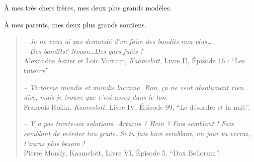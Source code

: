 
\begin{dedication}

    À mes très chers frères, mes deux plus grands modèles.

    À mes parents, mes deux plus grands soutiens.


    \hr{}

    \vfill{}


    \begin{small}
    \begin{quote}
        \emph{-- Je ne vous ai pas demandé d'en faire des \emph{bandits} non plus\dots}\\
        \emph{-- Des \emph{bandits}? Nooon\dots Des gars futés !}\\
        Alexandre Astier et Loïc Varraut,
        \emph{Kaamelott}, Livre II, Épisode 16 : ``Les tuteurs''.

    \vspace*{4pt}

        \emph{-- Victoriae mundis et mundis lacrima. Bon, ça ne veut absolument rien dire, mais je trouve que c’est assez dans le ton.}\\
        François Rollin, \emph{Kaamelott}, Livre IV, Épisode 99, ``Le désordre et la nuit''.

    \vspace*{4pt}

        \emph{
            -- Y a pas trente-six solutions.
            Arturus ? Hein ? Fais semblant !
            Fais semblant de mériter ton grade.
            Si tu fais bien semblant, un jour tu verras, t'auras plus besoin !
        }\\
        Pierre Mondy, Kaamelott, Livre VI, Épisode 5, ``Dux Bellorum''.


\end{quote}
\end{small}
\end{dedication}
